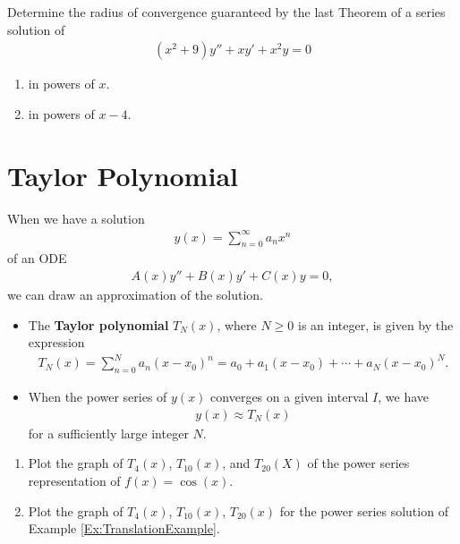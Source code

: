 \documentclass[12pt,a4paper]{article}
\newcounter{example}[section]
\begin{document}
	\vspace*{16pt}
	
	\begin{example}
	Determine the radius of convergence guaranteed by the last Theorem of a series solution of
		\begin{align*}
		(x^2 + 9) y'' + xy' + x^2 y = 0
		\end{align*}
		\begin{enumerate}[label=\textbf{(\alph*)}]
		\item in powers of $x$.
		\item in powers of $x - 4$.
		\end{enumerate}
	\end{example}
	
	\newpage
	
	\section{Taylor Polynomial}
	When we have a solution
		\begin{align*}
		y(x) = \sum_{n = 0}^\infty a_n x^n
		\end{align*}
	of an ODE
		\begin{align*}
		A(x) y'' + B(x) y' + C(x) y = 0,
		\end{align*}
	we can draw an approximation of the solution.
	
	\begin{itemize}
	\item The \textbf{Taylor polynomial} $T_N (x)$, where $N \geq 0$ is an integer, is given by the expression
		\begin{align*}
		T_N (x) = \sum_{n = 0}^N a_n (x - x_0)^n = a_0 + a_1 (x - x_0) + \cdots + a_N (x - x_0)^N .
		\end{align*}
	\item When the power series of $y(x)$ converges on a given interval $I$, we have
		\begin{align*}
		y(x) \approx T_N (x)
		\end{align*}
	for a sufficiently large integer $N$.
	\end{itemize}
	
	\vspace*{16pt}
	
	\begin{example}
	\begin{enumerate}[label=\textbf{(\alph*)}]
	\item Plot the graph of $T_{4} (x)$, $T_{10} (x)$, and $T_{20} (X)$ of the power series representation of $f(x) = \cos (x)$.
	\item Plot the graph of $T_{4}(x)$, $T_{10} (x)$, $T_{20} (x)$ for the power series solution of Example \ref{Ex:TranslationExample}. 
	\end{enumerate}
	\end{example}
	
	\newpage
	
	\phantom{2}
	
	\newpage
\end{document}
